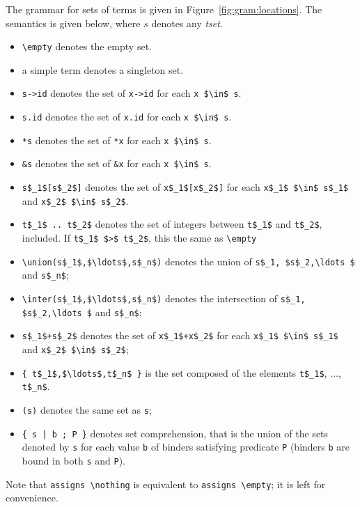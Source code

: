 The grammar for sets of terms is given in
Figure~\ref{fig:gram:locations}. The semantics is given below,
where $s$ denotes any \textsl{tset}.
\begin{itemize}
\item \lstinline|\empty| denotes the empty set.
\item a simple term denotes a singleton set.
\item \lstinline|s->id| denotes the set of \lstinline|x->id| for each
  \lstinline|x $\in$ s|.
\item \lstinline|s.id| denotes the set of \lstinline|x.id| for each
  \lstinline|x $\in$ s|.
\item \lstinline|*s| denotes the set of \lstinline|*x| for each
  \lstinline|x $\in$ s|.
\item \lstinline|&s| denotes the set of \lstinline|&x| for each
  \lstinline|x $\in$ s|.
\item \lstinline|s$_1$[s$_2$]| denotes the set of
\lstinline|x$_1$[x$_2$]| for each \lstinline|x$_1$ $\in$ s$_1$|
  and \lstinline|x$_2$ $\in$ s$_2$|.
\item \lstinline|t$_1$ .. t$_2$| denotes the set of integers between 
\lstinline|t$_1$| and \lstinline|t$_2$|, included. 
If \lstinline|t$_1$ $>$ t$_2$|, this the same as \lstinline+\empty+
\item \lstinline|\union(s$_1$,$\ldots$,s$_n$)|
denotes the union 
of \lstinline|s$_1, $s$_2,\ldots $| and \lstinline|s$_n$|;
\item \lstinline|\inter(s$_1$,$\ldots$,s$_n$)|
denotes the intersection 
of \lstinline|s$_1, $s$_2,\ldots $| and \lstinline|s$_n$|;
\item \lstinline|s$_1$+s$_2$| denotes the set of
  \lstinline|x$_1$+x$_2$| for each \lstinline|x$_1$ $\in$ s$_1$|
  and \lstinline|x$_2$ $\in$ s$_2$|;
\item \lstinline|{ t$_1$,$\ldots$,t$_n$ }| is the set composed of the
elements \lstinline|t$_1$|, $\ldots$, \lstinline|t$_n$|.
\item \lstinline|(s)| denotes the same set as \lstinline|s|;
\item \lstinline+{ s | b ; P }+ denotes set
  comprehension,
  that is the union of the sets denoted by \lstinline|s| for each
  value \lstinline|b| of binders
  satisfying predicate \lstinline|P|
  (binders \lstinline|b| are bound in both \lstinline|s| and \lstinline|P|).
\end{itemize}

Note that \lstinline|assigns \nothing| is equivalent to
\lstinline|assigns \empty|; it is left for convenience.

